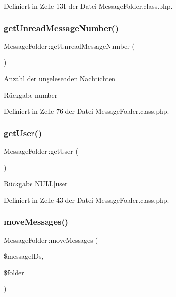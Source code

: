 Definiert in Zeile 131 der Datei Message\+Folder.\+class.\+php.

\mbox{\label{class_message_folder_a86065e5cc85eb0c995f79053bdfa122b}} 
\subsubsection{\texorpdfstring{get\+Unread\+Message\+Number()}{getUnreadMessageNumber()}}
{\footnotesize\ttfamily Message\+Folder\+::get\+Unread\+Message\+Number (\begin{DoxyParamCaption}{ }\end{DoxyParamCaption})}

Anzahl der ungelesenden Nachrichten \begin{DoxyReturn}{Rückgabe}
number 
\end{DoxyReturn}


Definiert in Zeile 76 der Datei Message\+Folder.\+class.\+php.

\mbox{\label{class_message_folder_a8157f15aee7a7968f6ce4dd8c4901de5}} 
\subsubsection{\texorpdfstring{get\+User()}{getUser()}}
{\footnotesize\ttfamily Message\+Folder\+::get\+User (\begin{DoxyParamCaption}{ }\end{DoxyParamCaption})}

\begin{DoxyReturn}{Rückgabe}
N\+U\+L\+L$\vert$user 
\end{DoxyReturn}


Definiert in Zeile 43 der Datei Message\+Folder.\+class.\+php.

\mbox{\label{class_message_folder_aae912619f4d1d5569c2eaf623c949ee2}} 
\subsubsection{\texorpdfstring{move\+Messages()}{moveMessages()}}
{\footnotesize\ttfamily Message\+Folder\+::move\+Messages (\begin{DoxyParamCaption}\item[{}]{\$message\+I\+Ds,  }\item[{}]{\$folder }\end{DoxyParamCaption})}


